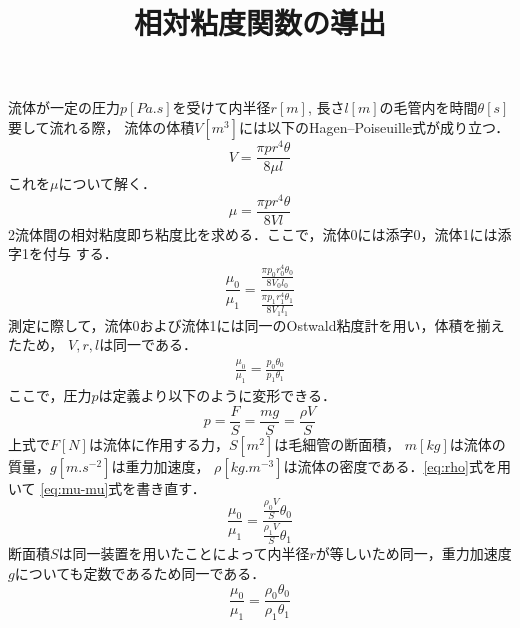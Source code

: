\documentclass{jlreq}
\title{相対粘度関数の導出}
\author{}
\begin{document}
	\maketitle
	流体が一定の圧力\(p[\si{Pa.s}]\)を受けて内半径\(r[\si{m}]\),
	長さ\(l[\si{m}]\)の毛管内を時間\(\theta[\si{s}]\)要して流れる際，
	流体の体積\(V[m^3]\)には以下のHagen–Poiseuille式が成り立つ．
		\begin{equation}
			V = \frac{\pi p r^4 \theta}{8\mu l}
		\end{equation}
	これを\(\mu\)について解く．
		\begin{equation}
			\mu = \frac{\pi p r^4 \theta}{8Vl}
		\end{equation}
	2流体間の相対粘度即ち粘度比を求める．ここで，流体0には添字0，流体1には添字1を付与
	する．
		\begin{equation}
			\frac{\mu_0}{\mu_1} = 
			\frac{
				\frac{\pi p_0 r_0^4 \theta_0}{8V_0l_0}
			}
			{
				\frac{\pi p_1 r_1^4 \theta_1}{8V_1l_1}
			}
		\end{equation}
	測定に際して，流体0および流体1には同一のOstwald粘度計を用い，体積を揃えたため，
	\(V,r,l\)は同一である．
		\begin{align}
			\frac{\mu_0}{\mu_1}= \frac{p_0\theta_0}{p_1\theta_1}\label{eq:mu-mu}
		\end{align}
	ここで，圧力\(p\)は定義より以下のように変形できる．
		\begin{equation}
			p = \frac{F}{S} = \frac{mg}{S} = \frac{\rho V}{S}\label{eq:rho}
		\end{equation}
	上式で\(F[\si{N}]\)は流体に作用する力，\(S[\si{m^2}]\)は毛細管の断面積，
	\(m[\si{kg}]\)は流体の質量，\(g[\si{m.s^{-2}}]\)は重力加速度，
	\(\rho[\si{kg.m^{-3}}]\)は流体の密度である．\eqref{eq:rho}式を用いて
	\eqref{eq:mu-mu}式を書き直す．
		\begin{equation}
			\frac{\mu_0}{\mu_1}= \frac{\frac{\rho_0 V}{S}\theta_0}
			{\frac{\rho_1 V}{S}\theta_1}	
		\end{equation}
	断面積\(S\)は同一装置を用いたことによって内半径\(r\)が等しいため同一，重力加速度
	\(g\)についても定数であるため同一である．
	\begin{equation}
		\frac{\mu_0}{\mu_1} = \frac{\rho_0\theta_0}{\rho_1\theta_1}
	\end{equation}
\end{document}
